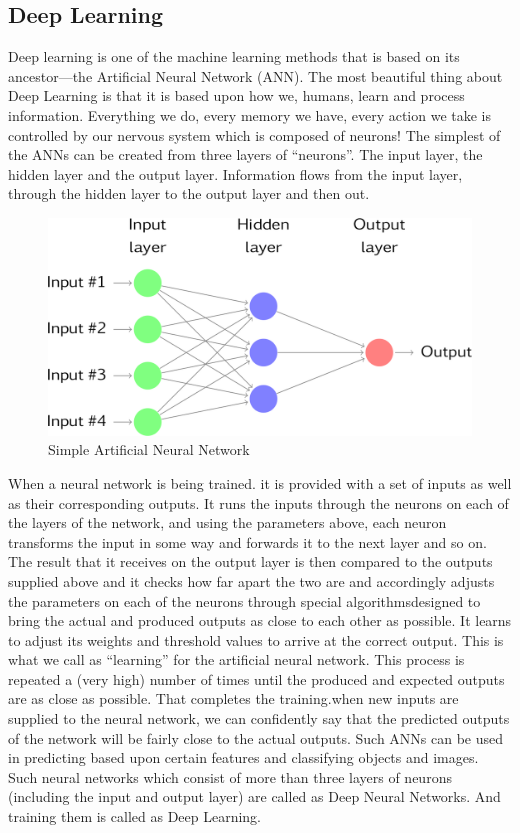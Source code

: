 \subsection{Deep Learning}
Deep learning is one of the machine learning methods that is based on its ancestor—the Artiﬁcial Neural Network (ANN).
The most beautiful thing about Deep Learning is that it is based upon how we, humans, learn and process information. Everything we do, every memory we have, every action we take is controlled by our nervous system which is composed of neurons! The simplest of the ANNs can be created from three layers of “neurons”. The input layer, the hidden layer and the output layer. Information flows from the input layer, through the hidden layer to the output layer and then out.
\begin{figure}[h]
\label{ss}
\centering
\includegraphics[width= 14 cm]{deep.png}
\caption{Simple Artificial Neural Network}
\end{figure}

When a neural network is being trained. it is provided with a set of inputs as well as their corresponding outputs. It runs the inputs through the neurons on each of the layers of the network, and using the parameters above, each neuron transforms the input in some way and forwards it to the next layer and so on. The result that it receives on the output layer is then compared to the outputs supplied above and it checks how far apart the two are and accordingly adjusts the parameters on each of the neurons through special algorithmsdesigned to bring the actual and produced outputs as close to each other as possible. It learns to adjust its weights and threshold values to arrive at the correct output. This is what we call as “learning” for the artificial neural network. This process is repeated a (very high) number of times until the produced and expected outputs are as close as possible. That completes the training.when new inputs are supplied to the neural network, we can confidently say that the predicted outputs of the network will be fairly close to the actual outputs. Such ANNs can be used in predicting based upon certain features and classifying objects and images.\\
Such neural networks which consist of more than three layers of neurons (including the input and output layer) are called as Deep Neural Networks. And training them is called as Deep Learning.

